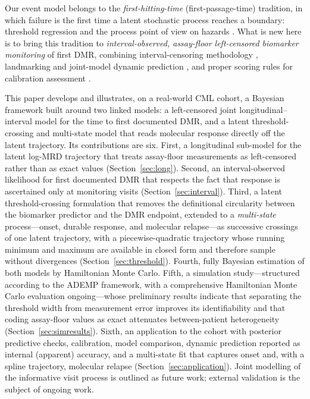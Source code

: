 \documentclass[11pt]{article}
\begin{document}
Our event model belongs to the \emph{first-hitting-time} (first-passage-time)
tradition, in which failure is the first time a latent stochastic process
reaches a boundary: threshold regression \cite{LeeWhitmore2006ThresholdRegression}
and the process point of view on hazards
\cite{AalenGjessing2001ProcessView,AalenBorganGjessing2008}. What is new here is
to bring this tradition to \emph{interval-observed, assay-floor left-censored
biomarker monitoring} of first DMR, combining interval-censoring methodology
\cite{Sun2006IntervalCensored}, landmarking and joint-model dynamic prediction
\cite{vanHouwelingen2007Landmarking,Rizopoulos2011DynamicPredictions}, and proper
scoring rules for calibration assessment \cite{GneitingRaftery2007ProperScoring}.

This paper develops and illustrates, on a real-world CML cohort, a Bayesian
framework built around two linked models: a left-censored joint
longitudinal--interval model for the time to first documented DMR, and a latent
threshold-crossing and multi-state model that reads molecular response directly
off the latent trajectory. Its contributions are six. First, a longitudinal
sub-model for the latent log-MRD trajectory that treats assay-floor
measurements as left-censored rather than as exact values
(Section~\ref{sec:long}). Second, an interval-observed likelihood for first
documented DMR that respects the fact that response is ascertained only at
monitoring visits (Section~\ref{sec:interval}). Third, a latent
threshold-crossing formulation that removes the definitional circularity
between the biomarker predictor and the DMR endpoint, extended to a
\emph{multi-state} process---onset, durable response, and molecular
relapse---as successive crossings of one latent trajectory, with a
piecewise-quadratic trajectory whose running minimum and maximum are available
in closed form and therefore sample without divergences
(Section~\ref{sec:threshold}). Fourth, fully Bayesian estimation of both models
by Hamiltonian Monte Carlo. Fifth, a simulation study---structured according to the ADEMP framework, with
a comprehensive Hamiltonian Monte Carlo evaluation ongoing---whose preliminary
results indicate that separating the threshold width from measurement error
improves its identifiability and that coding assay-floor values as exact
attenuates between-patient heterogeneity (Section~\ref{sec:simresults}). Sixth, an application to the cohort with
posterior predictive checks, calibration, model comparison, dynamic prediction
reported as internal (apparent) accuracy, and a multi-state fit that captures
onset and, with a spline trajectory, molecular relapse
(Section~\ref{sec:application}). Joint modelling of the informative visit
process is outlined as future work; external validation is the subject of
ongoing work.
\end{document}
